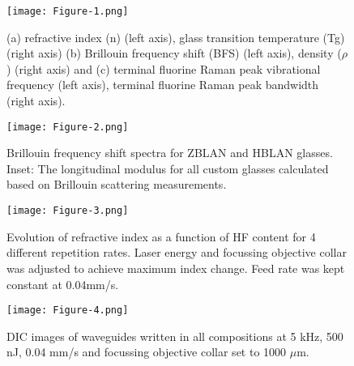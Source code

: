 \documentclass[11pt]{article}
\begin{document}
\begin{figure}[ht]
\centering
\texttt{[image: Figure-1.png]}\caption{(a) refractive index (n) (left axis), glass transition temperature (Tg) (right axis) (b) Brillouin frequency shift (BFS) (left axis), density ($\rho$) (right axis) and (c) terminal fluorine Raman peak vibrational frequency (left axis), terminal fluorine Raman peak bandwidth (right axis).}
\label{Fig-1}
\end{figure}

\begin{figure}[ht]
\centering
\texttt{[image: Figure-2.png]}\caption{Brillouin frequency shift spectra for ZBLAN and HBLAN glasses. Inset: The longitudinal modulus for all custom glasses calculated based on Brillouin scattering measurements.}
\label{BFS}
\end{figure}

\begin{figure}[ht]
\vspace{1cm}
\centering
\texttt{[image: Figure-3.png]}\caption{Evolution of refractive index as a function of HF content for 4 different repetition rates. Laser energy and focussing objective collar was adjusted to achieve maximum index change. Feed rate was kept constant at 0.04mm/s.}
\label{Rep_Rate}
\end{figure}

\begin{figure}[ht]
\centering
\texttt{[image: Figure-4.png]}\caption{DIC images of waveguides written in all compositions at 5 kHz, 500 nJ, 0.04 mm/s and focussing objective collar set to 1000 $\mu$m.}
\label{DIC}
\end{figure}
\end{document}
